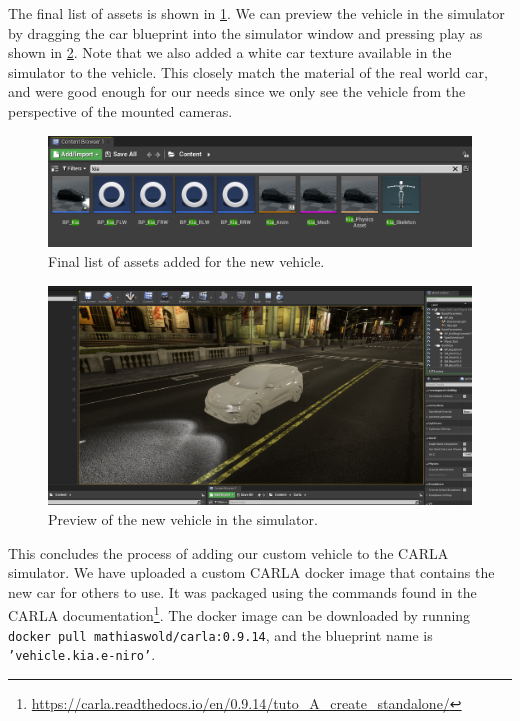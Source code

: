 The final list of assets is shown in \cref{fig:ue-kia-assets}. We can preview the vehicle in the simulator by dragging the car blueprint into the simulator window and pressing play as shown in \cref{fig:ue-kia}. Note that we also added a white car texture available in the simulator to the vehicle. This closely match the material of the real world car, and were good enough for our needs since we only see the vehicle from the perspective of the mounted cameras.

\begin{figure}[h!]
    \centering
    \includegraphics[width=\textwidth]{chapters/3-method/figures/ue-kia-assets.png}
    \caption{Final list of assets added for the new vehicle.}
    \label{fig:ue-kia-assets}
\end{figure}


\begin{figure}[h!]    
    \centering
    \includegraphics[width=\textwidth]{chapters/3-method/figures/ue-kia.png}
    \caption{Preview of the new vehicle in the simulator.}
    \label{fig:ue-kia}
\end{figure}


This concludes the process of adding our custom vehicle to the CARLA simulator. We have uploaded a custom CARLA docker image that contains the new car for others to use. It was packaged using the commands found in the CARLA documentation\footnote{\url{https://carla.readthedocs.io/en/0.9.14/tuto_A_create_standalone/}}. The docker image can be downloaded by running \texttt{docker pull mathiaswold/carla:0.9.14}, and the blueprint name is \texttt{'vehicle.kia.e-niro'}.
